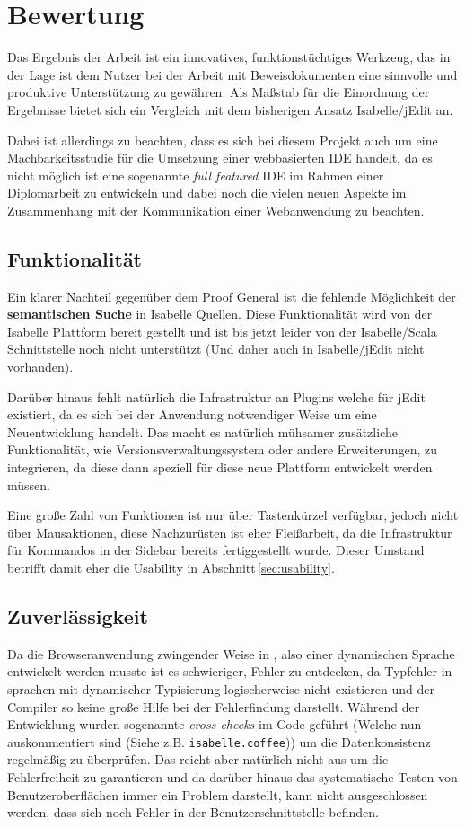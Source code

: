 \chapter{Bewertung}

Das Ergebnis der Arbeit ist ein innovatives, funktionstüchtiges Werkzeug, das in der Lage ist dem
Nutzer bei der Arbeit mit Beweisdokumenten eine sinnvolle und produktive Unterstützung zu gewähren.
Als Maßstab für die Einordnung der Ergebnisse bietet sich ein Vergleich mit dem bisherigen Ansatz
Isabelle/jEdit an. 

Dabei ist allerdings zu beachten, dass es sich bei diesem Projekt auch um eine Machbarkeitsstudie
für die Umsetzung einer webbasierten IDE handelt, da es nicht möglich ist eine sogenannte
\textit{full featured} IDE im Rahmen einer Diplomarbeit zu entwickeln und dabei noch die vielen
neuen Aspekte im Zusammenhang mit der Kommunikation einer Webanwendung zu beachten.

\section{Funktionalität}

Ein klarer Nachteil gegenüber dem Proof General ist die fehlende Möglichkeit der
\textbf{semantischen Suche} in Isabelle Quellen. Diese Funktionalität wird von der Isabelle
Plattform bereit gestellt und ist bis jetzt leider von der Isabelle/Scala Schnittstelle noch nicht
unterstützt (Und daher auch in Isabelle/jEdit nicht vorhanden).

Darüber hinaus fehlt natürlich die Infrastruktur an Plugins welche für jEdit existiert, da es sich
bei der Anwendung notwendiger Weise um eine Neuentwicklung handelt. Das macht es natürlich mühsamer
zusätzliche Funktionalität, wie Versionsverwaltungssystem oder andere Erweiterungen, zu integrieren,
da diese dann speziell für diese neue Plattform entwickelt werden müssen.

Eine große Zahl von Funktionen ist nur über Tastenkürzel verfügbar, jedoch nicht über Mausaktionen,
diese Nachzurüsten ist eher Fleißarbeit, da die Infrastruktur für Kommandos in der Sidebar bereits
fertiggestellt wurde. Dieser Umstand betrifft damit eher die Usability in
Abschnitt\,\ref{sec:usability}.

\section{Zuverlässigkeit}

Da die Browseranwendung zwingender Weise in , also einer dynamischen Sprache entwickelt
werden musste ist es schwieriger, Fehler zu entdecken, da Typfehler in sprachen mit dynamischer
Typisierung logischerweise nicht existieren und der Compiler so keine große Hilfe bei der
Fehlerfindung darstellt. Während der Entwicklung wurden sogenannte \textit{cross checks} im Code
geführt (Welche nun auskommentiert sind (Siehe z.B. \texttt{isabelle.coffee})) um die
Datenkonsistenz regelmäßig zu überprüfen. Das reicht aber natürlich nicht aus um die Fehlerfreiheit
zu garantieren und da darüber hinaus das systematische Testen von Benutzeroberflächen immer ein
Problem darstellt, kann nicht ausgeschlossen werden, dass sich noch Fehler in der
Benutzerschnittstelle befinden.

